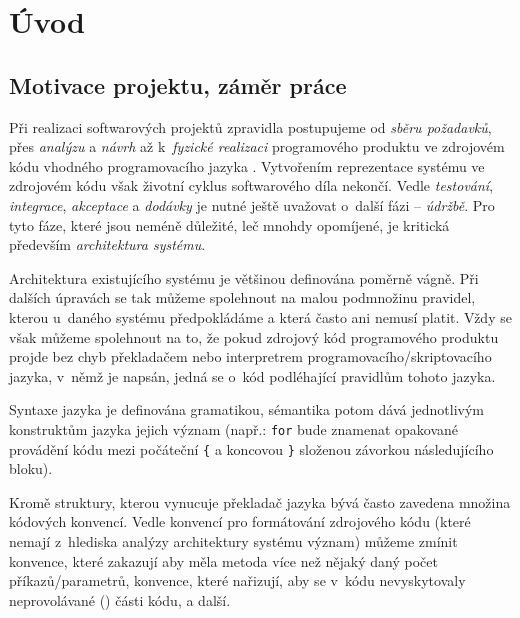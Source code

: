 \chapter{Úvod}

\section{Motivace projektu, záměr práce}
\label{introduction-motivation}

Při realizaci softwarových projektů zpravidla postupujeme od \emph{sběru požadavků}, přes \emph{analýzu} a \emph{návrh} až k~\emph{fyzické realizaci} programového produktu ve zdrojovém kódu vhodného programovacího jazyka \cite{wiki:sdlc}. Vytvořením reprezentace systému ve zdrojovém kódu však životní cyklus softwarového díla nekončí. Vedle \emph{testování}, \emph{integrace}, \emph{akceptace} a \emph{dodávky} je nutné ještě uvažovat o~další fázi -- \emph{údržbě}. Pro tyto fáze, které jsou neméně důležité, leč mnohdy opomíjené, je kritická především \emph{architektura systému}.

Architektura existujícího systému je většinou definována poměrně vágně. Při dalších úpravách se tak můžeme spolehnout na malou podmnožinu pravidel, kterou u~daného systému předpokládáme a která často ani nemusí platit. Vždy se však můžeme spolehnout na to, že pokud zdrojový kód programového produktu projde bez chyb překladačem nebo interpretrem programovacího/skriptovacího jazyka, v~němž je napsán, jedná se o~kód podléhající pravidlům tohoto jazyka.

Syntaxe jazyka je definována gramatikou, sémantika potom dává jednotlivým konstruktům jazyka jejich význam (např.: \verb+for+ bude znamenat opakované provádění kódu mezi počáteční \verb+{+ a koncovou \verb+}+ složenou závorkou následujícího bloku).

Kromě struktury, kterou vynucuje překladač jazyka bývá často zavedena množina kódových konvencí. Vedle konvencí pro formátování zdrojového kódu (které nemají z~hlediska analýzy architektury systému význam) můžeme zmínit konvence, které zakazují aby měla metoda více než nějaký daný počet příkazů/parametrů, konvence, které nařizují, aby se v~kódu nevyskytovaly neprovolávané () části kódu, a další.

